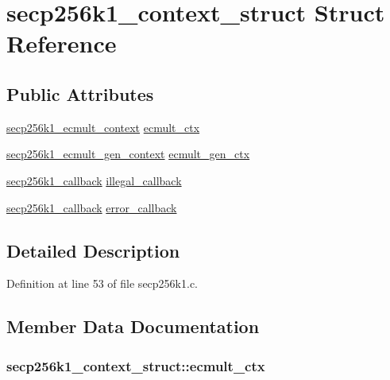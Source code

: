 \hypertarget{structsecp256k1__context__struct}{}\section{secp256k1\+\_\+context\+\_\+struct Struct Reference}
\label{structsecp256k1__context__struct}
\subsection*{Public Attributes}
\begin{DoxyCompactItemize}
\item 
\hyperlink{structsecp256k1__ecmult__context}{secp256k1\+\_\+ecmult\+\_\+context} \hyperlink{structsecp256k1__context__struct_ab6a825dd98cab724df0f0060cf515eab}{ecmult\+\_\+ctx}
\item 
\hyperlink{structsecp256k1__ecmult__gen__context}{secp256k1\+\_\+ecmult\+\_\+gen\+\_\+context} \hyperlink{structsecp256k1__context__struct_aacc2071a68f9c5a6c05eb783f523b9eb}{ecmult\+\_\+gen\+\_\+ctx}
\item 
\hyperlink{structsecp256k1__callback}{secp256k1\+\_\+callback} \hyperlink{structsecp256k1__context__struct_a6f73572b18e62b306c5699e9e1470ab5}{illegal\+\_\+callback}
\item 
\hyperlink{structsecp256k1__callback}{secp256k1\+\_\+callback} \hyperlink{structsecp256k1__context__struct_aa34a996f869676899e8625adfb6c6f1d}{error\+\_\+callback}
\end{DoxyCompactItemize}


\subsection{Detailed Description}


Definition at line 53 of file secp256k1.\+c.



\subsection{Member Data Documentation}
\hypertarget{structsecp256k1__context__struct_ab6a825dd98cab724df0f0060cf515eab}{}
\subsubsection[{ecmult\+\_\+ctx}]{ secp256k1\+\_\+context\+\_\+struct\+::ecmult\+\_\+ctx}\label{structsecp256k1__context__struct_ab6a825dd98cab724df0f0060cf515eab}


